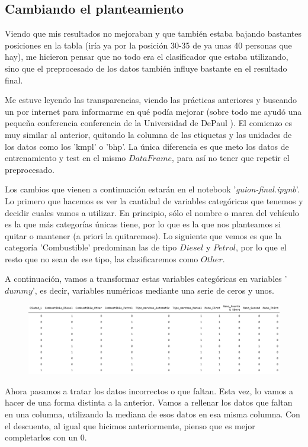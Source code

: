 \documentclass[11pt,a4paper]{article}
\begin{document}
\subsection{Cambiando el planteamiento}

Viendo que mis resultados no mejoraban y que también estaba bajando bastantes posiciones en la tabla (iría ya por la posición 30-35
de ya unas 40 personas que hay), me hicieron pensar que no todo era el clasificador que estaba utilizando, sino que el preprocesado
de los datos también influye bastante en el resultado final.

Me estuve leyendo las transparencias, viendo las prácticas anteriores y buscando un por internet para informarme en qué podía
mejorar (sobre todo me ayudó una pequeña conferencia conferencia de la Universidad de DePaul \cite{bib:depaul-uni}). El comienzo es
muy similar al anterior, quitando la columna de las etiquetas y las unidades de los datos como los 'kmpl' o 'bhp'. La única
diferencia es que meto los datos de entrenamiento y test en el mismo $DataFrame$, para así no tener que repetir el preprocesado.

\label{pp3}
Los cambios que vienen a continuación estarán en el notebook '\textit{guion-final.ipynb}'. Lo primero que hacemos es ver la
cantidad de variables categóricas que tenemos y decidir cuales vamos a utilizar. En principio, sólo el nombre o marca del vehículo
es la que más categorías únicas tiene, por lo que es la que nos planteamos si quitar o mantener (a priori la quitaremos). Lo
siguiente que vemos es que la categoría 'Combustible' predominan las de tipo $Diesel$ y $Petrol$, por lo que el resto que no sean
de ese tipo, las clasificaremos como $Other$.

A continuación, vamos a transformar estas variables categóricas en variables '$dummy$', es decir, variables numéricas mediante una
serie de ceros y unos.

\begin{figure}[H]
    \centering
    \includegraphics[scale=0.5]{img/dummy.png}
\end{figure}

Ahora pasamos a tratar los datos incorrectos o que faltan. Esta vez, lo vamos a hacer de una forma distinta a la anterior. Vamos a
rellenar los datos que faltan en una columna, utilizando la mediana de esos datos en esa misma columna. Con el descuento, al igual
que hicimos anteriormente, pienso que es mejor completarlos con un 0.
\end{document}
